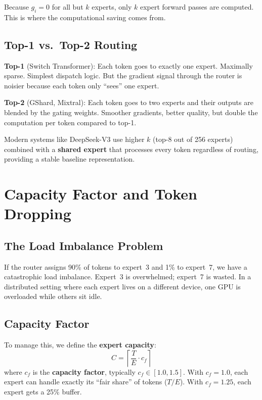 Because $g_i = 0$ for all but $k$ experts, only $k$ expert forward passes are computed. This is where the computational saving comes from.

\subsection{Top-1 vs.\ Top-2 Routing}

\textbf{Top-1} (Switch Transformer): Each token goes to exactly one expert. Maximally sparse. Simplest dispatch logic. But the gradient signal through the router is noisier because each token only ``sees'' one expert.

\textbf{Top-2} (GShard, Mixtral): Each token goes to two experts and their outputs are blended by the gating weights. Smoother gradients, better quality, but double the computation per token compared to top-1.

Modern systems like DeepSeek-V3 use higher $k$ (top-8 out of 256 experts) combined with a \textbf{shared expert} that processes every token regardless of routing, providing a stable baseline representation.

\section{Capacity Factor and Token Dropping}
\label{ch:13:sec:capacity}

\subsection{The Load Imbalance Problem}

If the router assigns 90\% of tokens to expert~3 and 1\% to expert~7, we have a catastrophic load imbalance. Expert~3 is overwhelmed; expert~7 is wasted. In a distributed setting where each expert lives on a different device, one GPU is overloaded while others sit idle.

\subsection{Capacity Factor}

To manage this, we define the \textbf{expert capacity}:
\begin{equation}
  C = \left\lceil \frac{T}{E} \cdot c_f \right\rceil
\end{equation}
where $c_f$ is the \textbf{capacity factor}, typically $c_f \in [1.0, 1.5]$. With $c_f = 1.0$, each expert can handle exactly its ``fair share'' of tokens ($T/E$). With $c_f = 1.25$, each expert gets a 25\% buffer.

